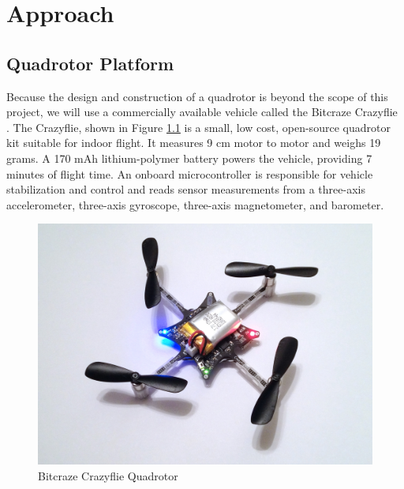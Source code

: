 \chapter{Approach}

\section{Quadrotor Platform}
Because the design and construction of a quadrotor is beyond the scope of  this project, we will use a commercially available vehicle called the Bitcraze Crazyflie \cite{bitcraze}. The Crazyflie, shown in Figure \ref{fig:quad} is a small, low cost, open-source quadrotor kit suitable for indoor flight. It measures 9 cm motor to motor and weighs 19 grams. A 170 mAh lithium-polymer battery powers the vehicle, providing 7 minutes of flight time. An onboard microcontroller is responsible for vehicle stabilization and control and reads sensor measurements from a three-axis accelerometer, three-axis gyroscope, three-axis magnetometer, and barometer.
\begin{figure}[!htb]
\centering \includegraphics[scale=.15]{../fig/crazyflie.jpg}
\caption{Bitcraze Crazyflie Quadrotor}
\label{fig:quad}
\end{figure}

